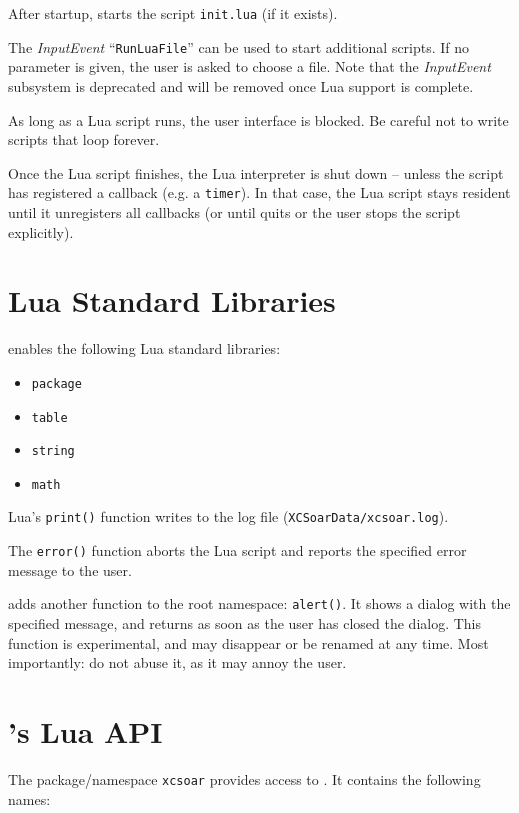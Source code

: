 After startup, \xc starts the script \texttt{init.lua} (if it
exists).

The \emph{InputEvent} ``\texttt{RunLuaFile}'' can be used to start
additional scripts.  If no parameter is given, the user is asked to
choose a file.  Note that the \emph{InputEvent} subsystem is
deprecated and will be removed once Lua support is complete.

As long as a Lua script runs, the \xc user interface is blocked.
Be careful not to write scripts that loop forever.

Once the Lua script finishes, the Lua interpreter is shut down --
unless the script has registered a callback (e.g. a \verb|timer|).  In
that case, the Lua script stays resident until it unregisters all
callbacks (or until \xc quits or the user stops the script
explicitly).

\section{Lua Standard Libraries}

\xc enables the following Lua standard libraries:

\begin{itemize}
\item \verb|package|
\item \verb|table|
\item \verb|string|
\item \verb|math|
\end{itemize}

Lua's \verb|print()| function writes to the \xc log file
(\texttt{XCSoarData/xcsoar.log}).

The \verb|error()| function aborts the Lua script and reports the
specified error message to the user.

\xc adds another function to the root namespace: \verb|alert()|.
It shows a dialog with the specified message, and returns as soon as
the user has closed the dialog.  This function is experimental, and
may disappear or be renamed at any time.  Most importantly: do not
abuse it, as it may annoy the user.

\section{\xc's Lua API}

The package/namespace \verb|xcsoar| provides access to \xc.  It
contains the following names:

